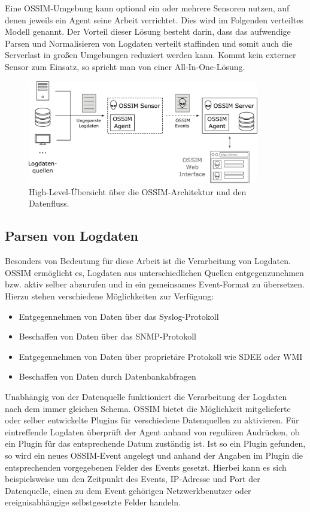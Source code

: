 Eine OSSIM-Umgebung kann optional ein oder mehrere Sensoren nutzen, auf denen jeweils ein Agent seine Arbeit verrichtet. Dies wird im Folgenden verteiltes Modell genannt. Der Vorteil dieser Lösung besteht darin, dass das aufwendige Parsen und Normalisieren von Logdaten verteilt staffinden und somit auch die Serverlast in großen Umgebungen reduziert werden kann. Kommt kein externer Sensor zum Einsatz, so spricht man von einer All-In-One-Lösung.

\begin{figure}[]
    \centering
        \includegraphics[width=0.9\textwidth]{dia/ossim_log_flow.pdf}
    \caption{High-Level-Übersicht über die OSSIM-Architektur und den Datenfluss.}
    \label{fig:ossim_log_flow}
\end{figure}


\subsection*{Parsen von Logdaten}

Besonders von Bedeutung für diese Arbeit ist die Verarbeitung von Logdaten. OSSIM ermöglicht es, Logdaten aus unterschiedlichen Quellen entgegenzunehmen bzw. aktiv selber abzurufen und in ein gemeinsames Event-Format zu übersetzen. Hierzu stehen verschiedene Möglichkeiten zur Verfügung:

\begin{itemize}
  \item Entgegennehmen von Daten über das Syslog-Protokoll
  \item Beschaffen von Daten über das SNMP-Protokoll
  \item Entgegennehmen von Daten über proprietäre Protokoll wie SDEE oder WMI
  \item Beschaffen von Daten durch Datenbankabfragen 
\end{itemize}

Unabhängig von der Datenquelle funktioniert die Verarbeitung der Logdaten nach dem immer gleichen Schema. OSSIM bietet die Möglichkeit mitgelieferte oder selber entwickelte Plugins für verschiedene Datenquellen zu aktivieren. Für eintreffende Logdaten überprüft der Agent anhand von regulären Audrücken, ob ein Plugin für das entsprechende Datum zuständig ist. Ist so ein Plugin gefunden, so wird ein neues OSSIM-Event angelegt und anhand der Angaben im Plugin die entsprechenden vorgegebenen Felder des Events gesetzt. Hierbei kann es sich beispielsweise um den Zeitpunkt des Events, IP-Adresse und Port der Datenquelle, einen zu dem Event gehörigen Netzwerkbenutzer oder ereignisabhängige selbstgesetzte Felder handeln.
